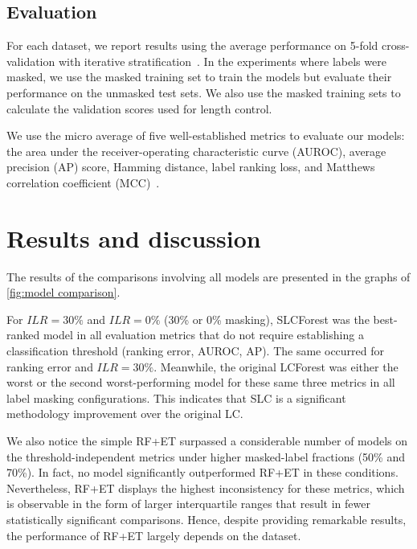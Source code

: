 \documentclass[conference,compsoc]{IEEEtran}
\begin{document}
\subsection{Evaluation}%

For each dataset, we report results using the average performance on 5-fold cross-validation with iterative stratification~\cite{sechidis2011stratification, szymanski2017network}. In the experiments where labels were masked, we use the masked training set to train the models but evaluate their performance on the unmasked test sets. We also use the masked training sets to calculate the validation scores used for length control.

We use the micro average of five well-established metrics to evaluate our models: the area under the receiver-operating characteristic curve (AUROC), average precision (AP) score, Hamming distance, label ranking loss, and Matthews correlation coefficient (MCC)~\cite{xu2019survey, waegeman2019multi}.


\section{Results and discussion}
\label{sec:results}

The results of the comparisons involving all models are presented in the graphs of \autoref{fig:model comparison}.

For $ILR=30\%$ and $ILR=0\%$ (30\% or 0\% masking), SLCForest was the best-ranked model in all evaluation metrics that do not require establishing a classification threshold (ranking error, AUROC, AP). The same occurred for ranking error and $ILR=30\%$. Meanwhile, the original LCForest was either the worst or the second worst-performing model for these same three metrics in all label masking configurations. This indicates that SLC is a significant methodology improvement over the original LC.

We also notice the simple RF+ET surpassed a considerable number of models on the threshold-independent metrics under higher masked-label fractions (50\% and 70\%). In fact, no model significantly outperformed RF+ET in these conditions.
%
%
%
Nevertheless, RF+ET displays the highest inconsistency for these metrics, which is observable in the form of larger interquartile ranges that result in fewer statistically significant comparisons. Hence, despite providing remarkable results, the performance of RF+ET largely depends on the dataset. 
\end{document}
